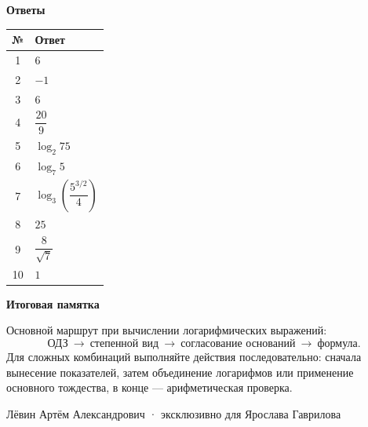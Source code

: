 \documentclass[a4paper,11pt]{article}
\begin{document}
\begin{center}{\Large\color{darkaccent}\bfseries Ответы}\end{center}
\vspace{10mm}
\renewcommand{\arraystretch}{1.6}
\begin{center}
\begin{tabularx}{.75\linewidth}{@{}cX@{}}
\toprule
\textbf{№} & \textbf{Ответ}\\
\midrule
1 & $6$\\
2 & $-1$\\
3 & $6$\\
4 & $\dfrac{20}{9}$\\
5 & $\log_2 75$\\
6 & $\log_7 5$\\
7 & $\displaystyle\log_3\!\left(\dfrac{5^{3/2}}4\right)$\\
8 & $25$\\
9 & $\displaystyle\dfrac8{\sqrt7}$\\
10 & $1$\\
\bottomrule
\end{tabularx}
\end{center}
\vspace{13mm}
{\color{darkaccent}\large\bfseries Итоговая памятка}\par\vspace{5pt}
Основной маршрут при вычислении логарифмических выражений:
\[
\text{ОДЗ}\ \longrightarrow\ \text{степенной вид}\ \longrightarrow\
\text{согласование оснований}\ \longrightarrow\ \text{формула}. 
\]
Для сложных комбинаций выполняйте действия последовательно: сначала вынесение показателей, затем объединение логарифмов или применение основного тождества, в конце --- арифметическая проверка.

\vfill
\begin{center}{\small\color{softgray}Лёвин Артём Александрович · эксклюзивно для Ярослава Гаврилова}\end{center}
\end{document}

